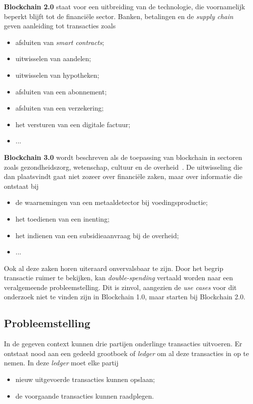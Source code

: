 \textbf{Blockchain 2.0} staat voor een uitbreiding van de technologie, die voornamelijk beperkt blijft tot de financiële sector. Banken, betalingen en de \textit{supply chain} geven aanleiding tot transacties zoals
\begin{itemize}
	\item afsluiten van \textit{smart contracts};
	\item uitwisselen van aandelen;
	\item uitwisselen van hypotheken;
	\item afsluiten van een abonnement;
	\item afsluiten van een verzekering;
	\item het versturen van een digitale factuur;
	\item ...
\end{itemize}
\textbf{Blockchain 3.0} wordt beschreven als de toepassing van blockchain in sectoren zoals gezondheidszorg, wetenschap, cultuur en de overheid~\autocite{Xu2019}. De uitwisseling die dan plaatsvindt gaat niet zozeer over financiële zaken, maar over informatie die ontstaat bij
\begin{itemize}
	\item de waarnemingen van een metaaldetector bij voedingsproductie;
	\item het toedienen van een inenting;
	\item het indienen van een subsidieaanvraag bij de overheid;
	\item ...
\end{itemize}

Ook al deze zaken horen uiteraard onvervalsbaar te zijn. Door het begrip transactie ruimer te bekijken, kan \textit{double-spending} vertaald worden naar een veralgemeende probleemstelling. Dit is zinvol, aangezien de \textit{use cases} voor dit onderzoek niet te vinden zijn in Blockchain 1.0, maar starten bij Blockchain 2.0.


\subsection{Probleemstelling}
\label{sub:probleemstelling}

In de gegeven context kunnen drie partijen onderlinge transacties uitvoeren. Er ontstaat nood aan een gedeeld grootboek of \textit{ledger} om al deze transacties in op te nemen. In deze \textit{ledger} moet elke partij
\begin{itemize}
	\item nieuw uitgevoerde transacties kunnen opslaan;
	\item de voorgaande transacties kunnen raadplegen.
\end{itemize}

